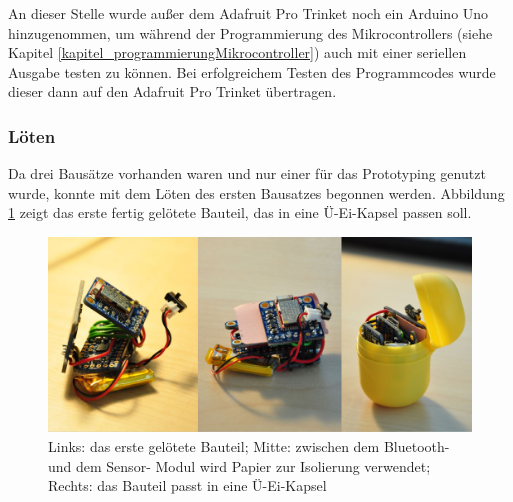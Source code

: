 An dieser Stelle wurde außer dem Adafruit Pro Trinket noch ein Arduino Uno hinzugenommen, um während der Programmierung des Mikrocontrollers (siehe Kapitel \ref{kapitel_programmierungMikrocontroller}) auch mit einer seriellen Ausgabe testen zu können. Bei erfolgreichem Testen des Programmcodes wurde dieser dann auf den Adafruit Pro Trinket übertragen.

\subsubsection{Löten}

Da drei Bausätze vorhanden waren und nur einer für das Prototyping genutzt wurde, konnte mit dem Löten des ersten Bausatzes begonnen werden. Abbildung \ref{fig:k3_erstesBauteilGeloetet} zeigt das erste fertig gelötete Bauteil, das in eine Ü-Ei-Kapsel passen soll.

\begin{figure}[ht]
	\centering
	\includegraphics[width=1\textwidth]{images/k3-erstesBauteilGeloetet.jpg}
	\caption {Links: das erste gelötete Bauteil; Mitte: zwischen dem Bluetooth- und dem Sensor-
		Modul wird Papier zur Isolierung verwendet; Rechts: das Bauteil passt in eine Ü-Ei-Kapsel}
	\label{fig:k3_erstesBauteilGeloetet}
\end{figure}